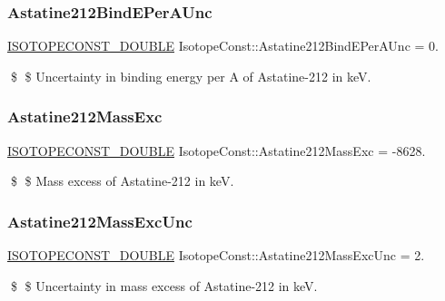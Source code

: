 \subsubsection{\texorpdfstring{Astatine212\+Bind\+E\+Per\+A\+Unc}{Astatine212BindEPerAUnc}}
{\footnotesize\ttfamily \mbox{\hyperlink{group___isotope_const-_macros_ga8f45a7272ce02c0b4c65c44636ed719a}{I\+S\+O\+T\+O\+P\+E\+C\+O\+N\+S\+T\+\_\+\+D\+O\+U\+B\+LE}} Isotope\+Const\+::\+Astatine212\+Bind\+E\+Per\+A\+Unc = 0.}

\$ \$ Uncertainty in binding energy per A of Astatine-\/212 in keV. \mbox{\label{group___isotope_const-_astatine-_at212_ga12563c7bf32aae0695e58f2c5f053d52}} 
\subsubsection{\texorpdfstring{Astatine212\+Mass\+Exc}{Astatine212MassExc}}
{\footnotesize\ttfamily \mbox{\hyperlink{group___isotope_const-_macros_ga8f45a7272ce02c0b4c65c44636ed719a}{I\+S\+O\+T\+O\+P\+E\+C\+O\+N\+S\+T\+\_\+\+D\+O\+U\+B\+LE}} Isotope\+Const\+::\+Astatine212\+Mass\+Exc = -\/8628.}

\$ \$ Mass excess of Astatine-\/212 in keV. \mbox{\label{group___isotope_const-_astatine-_at212_gaaabab985801269f0cd296e2c8d237154}} 
\subsubsection{\texorpdfstring{Astatine212\+Mass\+Exc\+Unc}{Astatine212MassExcUnc}}
{\footnotesize\ttfamily \mbox{\hyperlink{group___isotope_const-_macros_ga8f45a7272ce02c0b4c65c44636ed719a}{I\+S\+O\+T\+O\+P\+E\+C\+O\+N\+S\+T\+\_\+\+D\+O\+U\+B\+LE}} Isotope\+Const\+::\+Astatine212\+Mass\+Exc\+Unc = 2.}

\$ \$ Uncertainty in mass excess of Astatine-\/212 in keV. \mbox{\label{group___isotope_const-_astatine-_at212_ga3e71d07a7f890d4bd052675a0b18d9ff}} 
